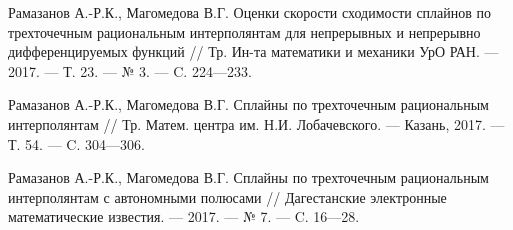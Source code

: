\begin{thebibliography}{111}
Рамазанов А.-Р.К., Магомедова В.Г. Оценки скорости сходимости сплайнов
 по трехточечным рациональным интерполянтам
 для непрерывных и непрерывно дифференцируемых функций
// Тр. Ин-та математики и механики УрО РАН. --- 2017. --- Т. 23. --- № 3. --- C. 224---233.




Рамазанов А.-Р.К., Магомедова В.Г.
Сплайны по трехточечным рациональным интерполянтам
// Тр. Матем. центра им. Н.И. Лобачевского. --- Казань, 2017. --- Т. 54. ---  C. 304---306.




Рамазанов А.-Р.К., Магомедова В.Г. Сплайны по трехточечным рациональным
 интерполянтам с автономными полюсами
// Дагестанские электронные математические известия. --- 2017. --- № 7. --- C. 16---28.







\end{thebibliography}
